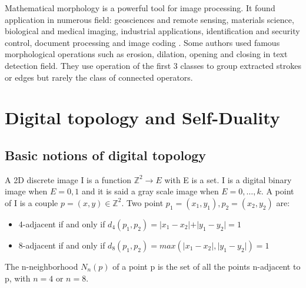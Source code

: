 \par Mathematical morphology is a powerful tool for image processing. It found application in numerous field: geosciences and remote sensing, materials science, biological and medical imaging, industrial applications, identification and security control, document processing and image coding \cite{Soille:2003:MIA:773286}. Some authors used famous morphological operations such as erosion, dilation, opening and closing in text detection field. They use operation of the first 3 classes to group extracted strokes\cite{Zhang.2015.Neurocomputing} or edges \cite{Ye.2003.ICICS} \cite{Pillai.2013.ICCPCT} but rarely the class of connected operators. 

\section{Digital topology and Self-Duality}
\subsection{Basic notions of digital topology}
\par
A 2D discrete image I is a function $ \mathbb{Z}^2 \rightarrow E$ with E is a set. I is a digital binary image when $E = {0,1}$ and it is said a gray scale image when $E = {0, \dots, k}$. A point of I is a couple $p = (x,y) \in \mathbb{Z}^2$. Two point $p_1 =(x_1,y_1),p_2=(x_2,y_2)$ are:
\begin{itemize}
\item 4-adjacent if and only if $d_4 (p_1,p_2) =\vert x_1 - x_2 \vert + \vert y_1 - y_2 \vert = 1 $
\item 8-adjacent if and only if $d_8 (p_1,p_2) =max (\vert x_1 - x_2 \vert , \vert y_1 - y_2 \vert) = 1 $
\end{itemize}
\par
The n-neighborhood $N_n (p)$ of a point p is the set of all the points n-adjacent to p, with $n = 4$ or $n = 8$.
